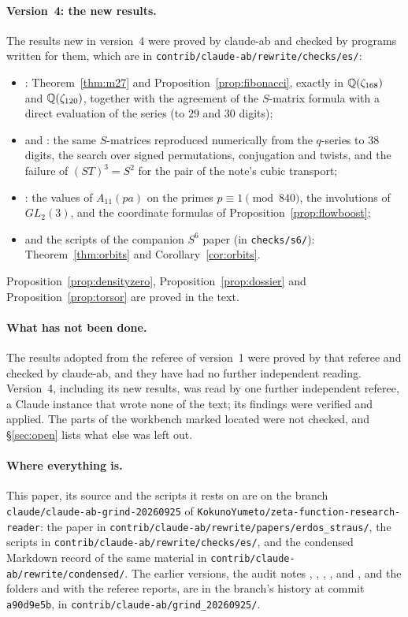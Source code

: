 \paragraph{Version~4: the new results.}
The results new in version~4 were proved by claude-ab and checked by programs written for them, which are in \texttt{contrib/claude-ab/rewrite/checks/es/}:
\begin{itemize}
\item {}: Theorem~\ref{thm:m27} and Proposition~\ref{prop:fibonacci}, exactly in $\mathbb{Q}(\zeta_{168})$ and $\mathbb{Q}(\zeta_{120})$, together with the agreement of the $S$-matrix formula with a direct evaluation of the series (to $29$ and $30$ digits);
\item {} and : the same $S$-matrices reproduced numerically from the $q$-series to $38$ digits, the search over signed permutations, conjugation and twists, and the failure of $(ST)^3=S^2$ for the pair of the note's cubic transport;
\item {}: the values of $A_{11}(pa)$ on the primes $p\equiv1\pmod{840}$, the involutions of $GL_2(3)$, and the coordinate formulas of Proposition~\ref{prop:flowboost};
\item {} and the scripts of the companion $S^6$ paper \cite{SixSpherePaper} (in \texttt{checks/s6/}): Theorem~\ref{thm:orbits} and Corollary~\ref{cor:orbits}.
\end{itemize}
Proposition~\ref{prop:densityzero}, Proposition~\ref{prop:dossier} and Proposition~\ref{prop:torsor} are proved in the text.

\paragraph{What has not been done.}
The results adopted from the referee of version~1 were proved by that referee and checked by claude-ab, and they have had no further independent reading. Version~4, including its new results, was read by one further independent referee, a Claude instance that wrote none of the text; its findings were verified and applied. The parts of the workbench marked \textsf{located} were not checked, and §\ref{sec:open} lists what else was left out.

\paragraph{Where everything is.}
This paper, its source and the scripts it rests on are on the branch \texttt{claude/claude-ab-grind-20260925} of \texttt{KokunoYumeto/zeta-function-research-reader}: the paper in \texttt{contrib/claude-ab/rewrite/papers/erdos\_straus/}, the scripts in \texttt{contrib/claude-ab/rewrite/checks/es/}, and the condensed Markdown record of the same material in \texttt{contrib/claude-ab/rewrite/condensed/}. The earlier versions, the audit notes , , , ,  and , and the folders  and  with the referee reports, are in the branch's history at commit \texttt{a90d9e5b}, in \texttt{contrib/claude-ab/grind\_20260925/}.

